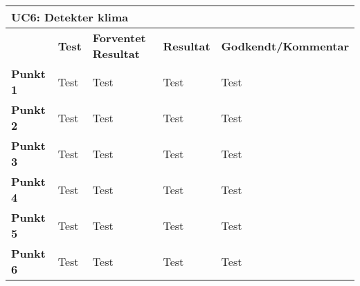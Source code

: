 \begin{table}[htbp] \centering
\begin{tabular}{|l|l|l|l|l|} %
	\hline
\multicolumn{5}{|l|}{\textbf{UC6: Detekter klima}} \\\hline
	&\textbf{Test} &\textbf{Forventet Resultat} &\textbf{Resultat} &\textbf{Godkendt/Kommentar} \\\hline
\textbf{Punkt 1}		&Test	&Test 	&Test	&Test \\\hline
\textbf{Punkt 2}		&Test	&Test 	&Test	&Test \\\hline
\textbf{Punkt 3}		&Test	&Test 	&Test	&Test \\\hline
\textbf{Punkt 4}		&Test	&Test 	&Test	&Test \\\hline
\textbf{Punkt 5}		&Test	&Test 	&Test	&Test \\\hline
\textbf{Punkt 6}		&Test	&Test 	&Test	&Test \\\hline
	\end{tabular}
	\label{ATUC6} 
\end{table}